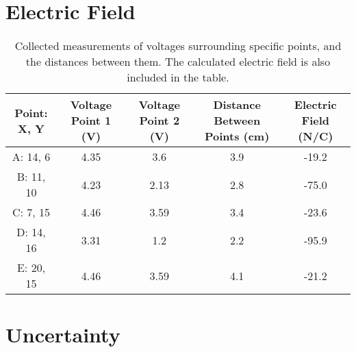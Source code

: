 \documentclass[12pt]{article}
\begin{document}
\section{Electric Field}

\begin{table}[H]
    \small
    \caption{Collected measurements of voltages surrounding specific points, and the distances between them.
            The calculated electric field is also included in the table.\\}
    \label{aggiungi}
    \hspace{-15mm} %
    \begin{tabular}{ccccc}
    \toprule
    Point: X, Y & Voltage Point 1 (V) & Voltage Point 2 (V) & Distance Between Points (cm) & Electric Field (N/C)\\
    \midrule
    A: 14, 6  & 4.35 & 3.6  & 3.9 & -19.2\\
    B: 11, 10 & 4.23 & 2.13 & 2.8 & -75.0\\
    C: 7, 15  & 4.46 & 3.59 & 3.4 & -23.6\\
    D: 14, 16 & 3.31 & 1.2  & 2.2 & -95.9\\
    E: 20, 15 & 4.46 & 3.59 & 4.1 & -21.2\\
    \bottomrule
    \end{tabular}
\end{table}

\section{Uncertainty}
\end{document}
